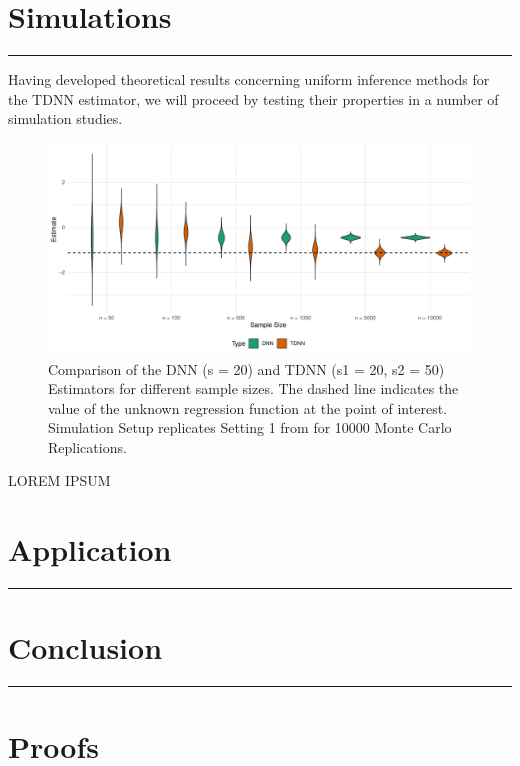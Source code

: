 \documentclass[letterpaper,10pt]{article}
\numberwithin{equation}{section}
\numberwithin{theorem}{section}
\theoremstyle{definition}
\newcommand{\1}{\mathbb{1}}
\begin{document}
\newpage
\section{Simulations}\label{Simulations}
\hrule

Having developed theoretical results concerning uniform inference methods for the TDNN estimator, we will proceed by testing their properties in a number of simulation studies.

\begin{figure}[H]
	\includegraphics[width = \textwidth]{../Code/Simulations/Graphics/TDNN_DNN.pdf}
	\caption{Comparison of the DNN (s = 20) and TDNN (s1 = 20, s2 = 50) Estimators for different sample sizes.
		The dashed line indicates the value of the unknown regression function at the point of interest.
		Simulation Setup replicates Setting 1 from \citet{demirkaya_optimal_2024} for 10000 Monte Carlo Replications.}
\end{figure}

{\color{red} LOREM IPSUM}


\section{Application}\label{Application}
\hrule

\section{Conclusion}\label{Conclusion}
\hrule

\newpage
\printbibliography

\appendix
\section{Proofs}

\end{document}
